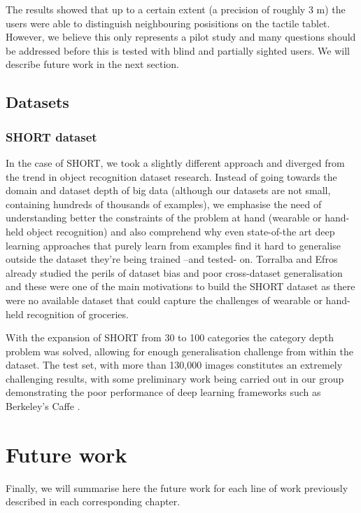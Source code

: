The results showed that up to a certain extent (a precision of roughly 3 m) the users were able to distinguish neighbouring posisitions on the tactile tablet. However, we believe this only represents a pilot study and many questions should be addressed before this is tested with blind and partially sighted users. We will describe future work in the next section.

\subsection{Datasets}

\subsubsection{SHORT dataset}

In the case of SHORT, we took a slightly different approach and diverged from the trend in object recognition dataset research. Instead of going towards the domain and dataset depth of big data (although our datasets are not small, containing hundreds of thousands of examples), we emphasise the need of understanding better the constraints of the problem at hand (wearable or hand-held object recognition) and also comprehend why even state-of-the art deep learning approaches that purely learn from examples find it hard to generalise outside the dataset they're being trained --and tested- on. Torralba and Efros already studied the perils of dataset bias and poor cross-dataset generalisation \cite{torralba2011unbiased} and these were one of the main motivations to build the SHORT dataset as there were no available dataset that could capture the challenges of wearable or hand-held recognition of groceries.

With the expansion of SHORT from 30 to 100 categories the category depth problem was solved, allowing for enough generalisation challenge from within the dataset. The test set, with more than	 130,000 images constitutes an extremely challenging results, with some preliminary work  being carried out in our group demonstrating the poor performance of deep learning frameworks such as Berkeley's Caffe \cite{jia2014caffe}.

\section{Future work}

Finally, we will summarise here the future work for each line of work previously described in each corresponding chapter.


